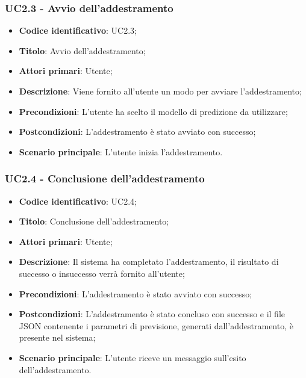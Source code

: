 \subsubsection{UC2.3 - Avvio dell'addestramento}
\begin{itemize}
    \item \textbf{Codice identificativo}: UC2.3;
    \item \textbf{Titolo}: Avvio dell'addestramento;
    \item \textbf{Attori primari}: Utente;
    \item \textbf{Descrizione}: Viene fornito all'utente un modo per avviare l'addestramento;
    \item \textbf{Precondizioni}: L'utente ha scelto il modello di predizione da utilizzare;
    \item \textbf{Postcondizioni}: L'addestramento è stato avviato con successo;
    \item \textbf{Scenario principale}: L'utente inizia l'addestramento.
\end{itemize}

\subsubsection{UC2.4 - Conclusione dell'addestramento}
\begin{itemize}
    \item \textbf{Codice identificativo}: UC2.4;
    \item \textbf{Titolo}: Conclusione dell'addestramento;
    \item \textbf{Attori primari}: Utente;
    \item \textbf{Descrizione}: Il sistema ha completato l'addestramento, il risultato di successo o insuccesso verrà fornito all'utente;
    \item \textbf{Precondizioni}: L'addestramento è stato avviato con successo;
    \item \textbf{Postcondizioni}: L'addestramento è stato concluso con successo e il file JSON contenente i parametri di previsione, generati dall'addestramento, è presente nel sistema;
    \item \textbf{Scenario principale}: L'utente riceve un messaggio sull'esito dell'addestramento.
\end{itemize}

